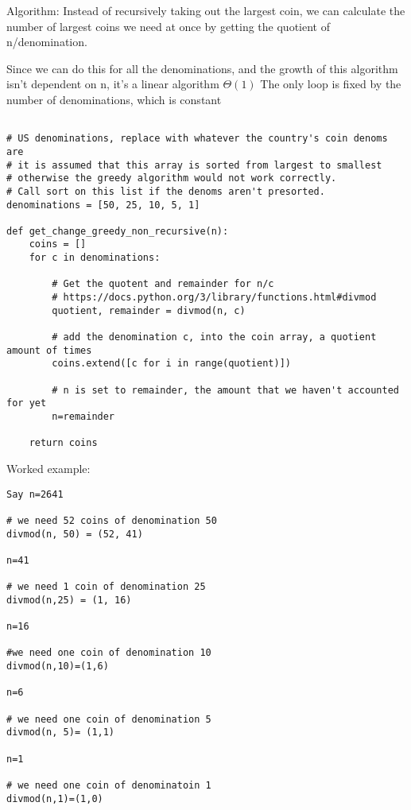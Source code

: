 \documentclass[12pt]{article}
\newenvironment{question}[2][Question]{\begin{trivlist}
		\item[\hskip \labelsep {\bfseries #1}\hskip \labelsep {\bfseries #2.}]}{\end{trivlist}}
\begin{document}
	\begin{question}{1b} 
	
	Algorithm: Instead of recursively taking out the largest coin, we can calculate the number of largest coins we need at once by getting the quotient of n/denomination.
	
	Since we can do this for all the denominations, and the growth of this algorithm isn't dependent on n, it's a linear algorithm $\Theta(1)$
	The only loop is fixed by the number of denominations, which is constant
	
	\begin{lstlisting}
	
# US denominations, replace with whatever the country's coin denoms are
# it is assumed that this array is sorted from largest to smallest 
# otherwise the greedy algorithm would not work correctly.
# Call sort on this list if the denoms aren't presorted.
denominations = [50, 25, 10, 5, 1]

def get_change_greedy_non_recursive(n):
	coins = []
	for c in denominations:
		
		# Get the quotent and remainder for n/c
		# https://docs.python.org/3/library/functions.html#divmod
		quotient, remainder = divmod(n, c)   
		
		# add the denomination c, into the coin array, a quotient amount of times
		coins.extend([c for i in range(quotient)])
		
		# n is set to remainder, the amount that we haven't accounted for yet
		n=remainder
	
	return coins
	\end{lstlisting}	
	
	Worked example:
		
\begin{lstlisting}
Say n=2641

# we need 52 coins of denomination 50
divmod(n, 50) = (52, 41)

n=41

# we need 1 coin of denomination 25
divmod(n,25) = (1, 16)

n=16

#we need one coin of denomination 10
divmod(n,10)=(1,6)

n=6

# we need one coin of denomination 5
divmod(n, 5)= (1,1)

n=1

# we need one coin of denominatoin 1
divmod(n,1)=(1,0)
	\end{lstlisting}	
	
\end{question}
\end{document}
